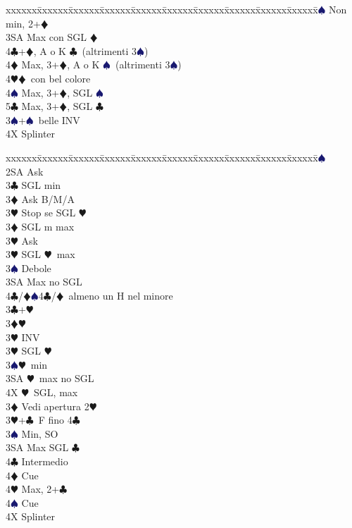 \documentclass[a4paper,italian]{article}
\newcommand{\BC}{\textcolor{OliveGreen}{$\clubsuit$}}
\newcommand{\BD}{\textcolor{RedOrange}{$\vardiamondsuit$}}
\newcommand{\BH}{\textcolor{Red2}{$\varheartsuit${}}}
\newcommand{\BS}{\textcolor{MidnightBlue}{$\spadesuit${}}}
\newenvironment{bidtable}
{\begin{tabbing}

    xxxxxx\=xxxxxx\=xxxxxx\=xxxxxx\=xxxxxx\=xxxxxx\=xxxxxx\=xxxxxx\=xxxxxx\=xxxxxx\=\kill}
{\end{tabbing} }%
\begin{document}
\begin{multicols*}{2}
\begin{bidtable}
        3\BS\> Non min, 2+\BD\\
        3SA\> Max con SGL \BD\\
        4\BC{}+\BD, A o K \BC\ (altrimenti 3\BS)\\
        4\BD\> Max, 3+\BD, A o K \BS\ (altrimenti 3\BS)\\
        4\BH{}\BD\ con bel colore\\
        4\BS\> Max, 3+\BD, SGL \BS\\
        5\BC\> Max, 3+\BD, SGL \BC\-\\
        3\BS {}+\BS\ belle INV\\
        4X \> Splinter\-\\
    \end{bidtable}
    \vfill
    \parbox{\textwidth}{}
    \columnbreak

    \begin{bidtable}
        2\BS\+\\
        2SA \> Ask\+\\
        3\BC \> SGL min\+\\
        3\BD \> Ask B/M/A\\
        3\BH \> Stop se SGL \BH \-\\
        3\BD \> SGL m max\+\\
        3\BH \> Ask\-\\
        3\BH \> SGL \BH\ max\\
        3\BS \> Debole\\
        3SA \> Max no SGL\\
        4\BC/\BD {}\BS 4\BC /\BD\ almeno un H nel minore\-\\
        3\BC {}+\BH \+\\
        3\BD {}\BH \+\\
        3\BH \> INV\-\\
        3\BH \> SGL \BH \\
        3\BS {}\BH\ min\\
        3SA \BH\ max no SGL\\
        4X \BH\ SGL, max\-\\
        3\BD\> Vedi apertura 2\BH\\
        3\BH {}+\BC\ F fino 4\BC\+\\
        3\BS \> Min, SO\\
        3SA \> Max SGL \BC\\
        4\BC \> Intermedio\\
        4\BD \> Cue\\
        4\BH \> Max, 2+\BC\\
        4\BS \> Cue\-\\
        4X \> Splinter\-\\
    \end{bidtable}


\end{multicols*}
\end{document}
